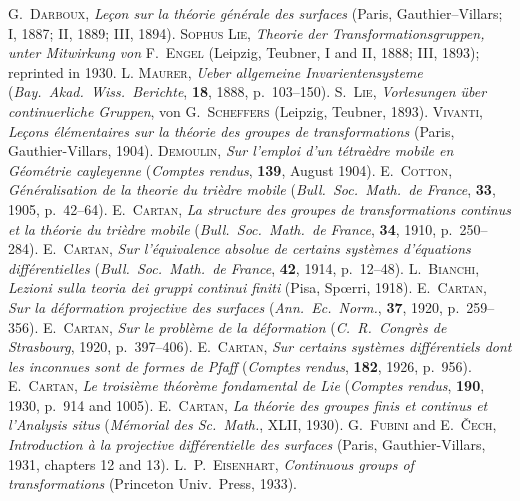 \documentclass[leqno,11pt]{book}
\numberwithin{equation}{chapter}
\theoremstyle{shape1}
\theoremstyle{shapesmall}
\begin{document}
\begin{thebibliography}{9}
  \textsc{G.~Darboux}, \emph{Leçon sur la théorie générale des surfaces} (Paris, Gauthier--Villars; I, 1887; II, 1889; III, 1894).
  \textsc{Sophus Lie}, \emph{Theorie der Transformationsgruppen, unter Mitwirkung von} \textsc{F.~Engel} (Leipzig, Teubner, I and II, 1888; III, 1893); reprinted in 1930.
  \textsc{L. Maurer}, \emph{Ueber allgemeine Invarientensysteme} (\emph{Bay.\ Akad.\ Wiss.\ Berichte}, \textbf{18}, 1888, p.~103--150).
  \textsc{S.~Lie}, \emph{Vorlesungen über continuerliche Gruppen}, von \textsc{G.~Scheffers} (Leipzig, Teubner, 1893).
  \textsc{Vivanti}, \emph{Leçons élémentaires sur la théorie des groupes de transformations} (Paris, Gauthier-Villars, 1904).
  \textsc{Demoulin}, \emph{Sur l'emploi d'un tétraèdre mobile en Géométrie cayleyenne} (\emph{Comptes rendus}, \textbf{139}, August 1904).
  \textsc{E.~Cotton}, \emph{Généralisation de la theorie du trièdre mobile} (\emph{Bull.~Soc.~Math.~de France}, \textbf{33}, 1905, p.~42--64).
  \textsc{E.~Cartan}, \emph{La structure des groupes de transformations continus et la théorie du trièdre mobile} (\emph{Bull.~Soc.~Math.~de France}, \textbf{34}, 1910, p.~250--284).
  \textsc{E.~Cartan}, \emph{Sur l'équivalence absolue de certains systèmes d'équations différentielles} (\emph{Bull.~Soc.~Math.~de France}, \textbf{42}, 1914, p.~12--48).
  \textsc{L.~Bianchi}, \emph{Lezioni sulla teoria dei gruppi continui finiti} (Pisa, Spœrri, 1918).
  \textsc{E.~Cartan}, \emph{Sur la déformation projective des surfaces} (\emph{Ann.~Ec.~Norm.}, \textbf{37}, 1920, p.~259--356).
  \textsc{E.~Cartan}, \emph{Sur le problème de la déformation} (\emph{C.~R.~Congrès de Strasbourg}, 1920, p.~397--406).
  \textsc{E.~Cartan}, \emph{Sur certains systèmes différentiels dont les inconnues sont de formes de Pfaff} (\emph{Comptes rendus}, \textbf{182}, 1926, p.~956).
  \textsc{E.~Cartan}, \emph{Le troisième théorème fondamental de Lie} (\emph{Comptes rendus}, \textbf{190}, 1930, p.~914 and 1005).  
  \textsc{E.~Cartan}, \emph{La théorie des groupes finis et continus et l'Analysis situs} (\emph{Mémorial des Sc.~Math.}, XLII, 1930).
  \textsc{G.~Fubini} and \textsc{E.~Čech}, \emph{Introduction à la projective différentielle des surfaces} (Paris, Gauthier-Villars, 1931, chapters 12 and 13).
  \textsc{L.~P.~Eisenhart}, \emph{Continuous groups of transformations} (Princeton Univ.~Press, 1933).

\end{thebibliography}
\end{document}
